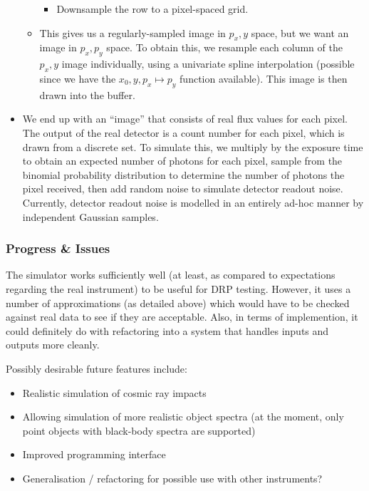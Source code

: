 \begin{itemize}
\begin{itemize}
\begin{itemize}
%
\item Downsample the row to a pixel-spaced grid.
\end{itemize}
%
\item This gives us a regularly-sampled image in $p_x, y$ space, but we want an image
in $p_x, p_y$ space. To obtain this, we resample each column of the $p_x, y$ image
individually, using a univariate spline interpolation (possible since we have the
$x_0, y, p_x \mapsto p_y$ function available). This image is then drawn into the buffer.
\end{itemize}
%
\item We end up with an ``image'' that consists of real flux values for
each pixel. The output of the real detector is a count number for each
pixel, which is drawn from a discrete set. To simulate this, we multiply
by the exposure time to obtain an expected number of photons for each
pixel, sample from the binomial probability distribution to determine
the number of photons the pixel received, then add random noise to simulate
detector readout noise. Currently, detector readout noise is modelled in an
entirely ad-hoc manner by independent Gaussian samples.

\end{itemize}
%

\subsubsection{Progress \& Issues}

The simulator works sufficiently well (at least, as compared to
expectations regarding the real instrument) to be useful for DRP
testing. However, it uses a number of approximations (as detailed above)
which would have to be checked against real data to see if they are
acceptable. Also, in terms of implemention, it could definitely do with
refactoring into a system that handles inputs and outputs more cleanly.

Possibly desirable future features include:
\begin{itemize}
\item Realistic simulation of cosmic ray impacts
\item Allowing simulation of more realistic object spectra (at the moment,
only point objects with black-body spectra are supported)
\item Improved programming interface
\item Generalisation / refactoring for possible use with other instruments?
\end{itemize}


